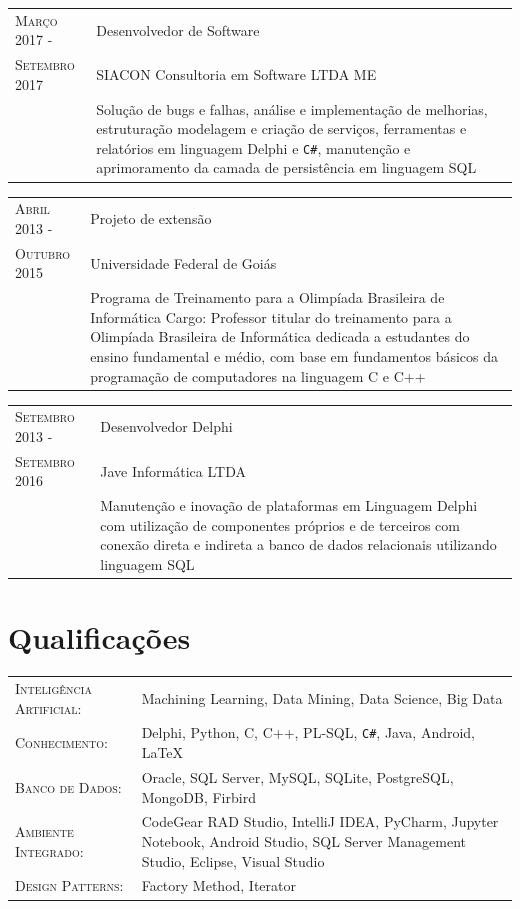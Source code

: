 \documentclass[12pt, oneside, openany, a4paper, english, brazil]{abntex2}
\begin{document}
\begin{tabular}{p{3.5cm}p{11cm}}
    \textsc{Março 2017} - & Desenvolvedor de Software \\
    \textsc{Setembro 2017} & SIACON Consultoria em Software LTDA ME \\ 
    \textsc{} & Solução de bugs e falhas, análise e implementação de melhorias, estruturação modelagem e criação de serviços, ferramentas e relatórios em linguagem Delphi e \texttt{C\#}, manutenção e aprimoramento da camada de persistência em linguagem SQL
\end{tabular}                                    

\begin{tabular}{p{3.5cm}p{11cm}}
    \textsc{Abril 2013} - & Projeto de extensão \\
    \textsc{Outubro 2015} & Universidade Federal de Goiás \\
    \textsc{} & Programa de Treinamento para a Olimpíada Brasileira de Informática Cargo: Professor titular do treinamento para a Olimpíada Brasileira de Informática dedicada a estudantes do ensino fundamental e médio, com base em fundamentos básicos da programação de computadores na linguagem C e C++
\end{tabular}

\begin{tabular}{p{3.5cm}p{11cm}}
    \textsc{Setembro 2013} - & Desenvolvedor Delphi \\
    \textsc{Setembro 2016} & Jave Informática LTDA \\ 
    \textsc{} & Manutenção e inovação de plataformas em Linguagem Delphi com utilização de componentes próprios e de terceiros com conexão direta e indireta a banco de dados relacionais utilizando linguagem SQL
\end{tabular}


\section{Qualificações}

\begin{tabular}{p{5.5cm}p{9cm}}
    \textsc{Inteligência Artificial:} & Machining Learning, Data Mining, Data Science, Big Data \\
    \textsc{Conhecimento:} & Delphi, Python, C, C++, PL-SQL, \texttt{C\#}, Java, Android, \LaTeX \\
    \textsc{Banco de Dados:} & Oracle, SQL Server, MySQL, SQLite, PostgreSQL, MongoDB, Firbird \\
    \textsc{Ambiente Integrado:} & CodeGear RAD Studio, IntelliJ IDEA, PyCharm, Jupyter Notebook, Android Studio, SQL Server Management Studio, Eclipse, Visual Studio \\
    \textsc{Design Patterns:} & Factory Method, Iterator \\
\end{tabular}
\end{document}
